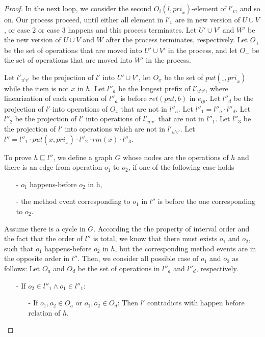 \begin {proof}
In the next loop, we consider the second $O_i(l,\textit{pri}_x)$-element of $l'_v$, and so on. Our process proceed, until either all element in $l'_v$ are in new version of $U \cup V$, or case $2$ or case $3$ happens and this process terminates. Let $U' \cup V'$ and $W'$ be the new version of $U \cup V$ and $W$ after the process terminates, respectively. Let $O_+$ be the set of operations that are moved into $U' \cup V'$ in the process, and let $O_-$ be the set of operations that are moved into $W'$ in the process.

Let $l'_{\textit{u'v'}}$ be the projection of $l'$ into $U' \cup V'$, let $O_x$ be the set of $\textit{put}(\_,\textit{pri}_x)$ while the item is not $x$ in $h$. Let $l''_a$ be the longest prefix of $l'_{\textit{u'v'}}$, where linearization of each operation of $l''_a$ is before $\textit{ret}(\textit{put},b)$ in $e_{\textit{lp}}$. Let $l''_d$ be the projection of $l'$ into operations of $O_x$ that are not in $l''_a$. Let $l''_1 = l''_a \cdot l''_d$. Let $l''_2$ be the projection of $l'$ into operations of $l'_{\textit{u'v'}}$ that are not in $l''_1$. Let $l''_3$ be the projection of $l'$ into operations which are not in $l'_{\textit{u'v'}}$. Let $l'' = l''_1 \cdot \textit{put}(x,\textit{pri}_x) \cdot l''_2 \cdot \textit{rm}(x) \cdot l''_3$.

To prove $h \sqsubseteq l''$, we define a graph $G$ whose nodes are the operations of $h$ and there is an edge from operation $o_1$ to $o_2$, if one of the following case holds

\begin{itemize}
\setlength{\itemsep}{0.5pt}
\item[-] $o_1$ happens-before $o_2$ in h,

\item[-] the method event corresponding to $o_1$ in $l''$ is before the one corresponding to $o_2$.
\end{itemize}

Assume there is a cycle in $G$. According the the property of interval order and the fact that the order of $l''$ is total, we know that there must exists $o_1$ and $o_2$, such that $o_1$ happens-before $o_2$ in $h$, but the corresponding method events are in the opposite order in $l''$. Then, we consider all possible case of $o_1$ and $o_2$ as follows: Let $O_a$ and $O_d$ be the set of operations in $l''_a$ and $l''_d$, respectively.

\begin{itemize}
\setlength{\itemsep}{0.5pt}
\item[-] If $o_2 \in l''_1 \wedge o_1 \in l''_1$:
    \begin{itemize}
    \setlength{\itemsep}{0.5pt}
    \item[-] If $o_1,o_2 \in O_a$ or $o_1,o_2 \in O_d$: Then $l'$ contradicts with happen before relation of $h$.


\end{itemize}
\end{itemize}
\end{proof}
